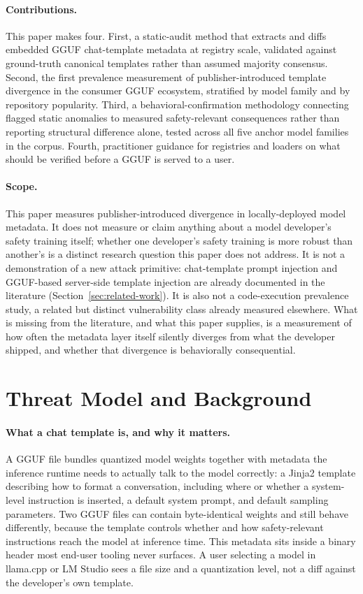 \documentclass[letterpaper,twocolumn,10pt]{article}
\begin{document}
\paragraph{Contributions.} This paper makes four. First, a static-audit method that extracts and diffs embedded GGUF chat-template metadata at registry scale, validated against ground-truth canonical templates rather than assumed majority consensus. Second, the first prevalence measurement of publisher-introduced template divergence in the consumer GGUF ecosystem, stratified by model family and by repository popularity. Third, a behavioral-confirmation methodology connecting flagged static anomalies to measured safety-relevant consequences rather than reporting structural difference alone, tested across all five anchor model families in the corpus. Fourth, practitioner guidance for registries and loaders on what should be verified before a GGUF is served to a user.

\paragraph{Scope.} This paper measures publisher-introduced divergence in locally-deployed model metadata. It does not measure or claim anything about a model developer's safety training itself; whether one developer's safety training is more robust than another's is a distinct research question this paper does not address. It is not a demonstration of a new attack primitive: chat-template prompt injection and GGUF-based server-side template injection are already documented in the literature (Section~\ref{sec:related-work}). It is also not a code-execution prevalence study, a related but distinct vulnerability class already measured elsewhere. What is missing from the literature, and what this paper supplies, is a measurement of how often the metadata layer itself silently diverges from what the developer shipped, and whether that divergence is behaviorally consequential.

\section{Threat Model and Background}
\label{sec:threat-model}

\paragraph{What a chat template is, and why it matters.} A GGUF file bundles quantized model weights together with metadata the inference runtime needs to actually talk to the model correctly: a Jinja2 template describing how to format a conversation, including where or whether a system-level instruction is inserted, a default system prompt, and default sampling parameters. Two GGUF files can contain byte-identical weights and still behave differently, because the template controls whether and how safety-relevant instructions reach the model at inference time. This metadata sits inside a binary header most end-user tooling never surfaces. A user selecting a model in llama.cpp or LM Studio sees a file size and a quantization level, not a diff against the developer's own template.
\end{document}
